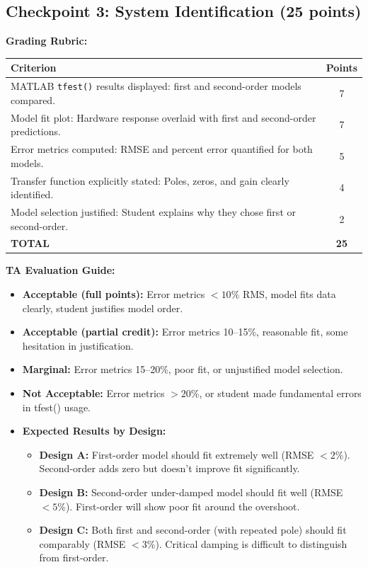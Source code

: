 \documentclass[11pt,letterpaper]{article}
\begin{document}
\subsection{Checkpoint 3: System Identification (25 points)}

\textbf{Grading Rubric:}

\begin{center}
\begin{tabularx}{0.95\textwidth}{|X|c|}
\hline
\textbf{Criterion} & \textbf{Points} \\
\hline
MATLAB \texttt{tfest()} results displayed: first and second-order models compared. & 7 \\
\hline
Model fit plot: Hardware response overlaid with first and second-order predictions. & 7 \\
\hline
Error metrics computed: RMSE and percent error quantified for both models. & 5 \\
\hline
Transfer function explicitly stated: Poles, zeros, and gain clearly identified. & 4 \\
\hline
Model selection justified: Student explains why they chose first or second-order. & 2 \\
\hline
\textbf{TOTAL} & \textbf{25} \\
\hline
\end{tabularx}
\end{center}

\noindent
\textbf{TA Evaluation Guide:}

\begin{itemize}
    \item \textbf{Acceptable (full points):} Error metrics $< 10\%$ RMS, model fits data clearly, student justifies model order.
    \item \textbf{Acceptable (partial credit):} Error metrics 10--15\%, reasonable fit, some hesitation in justification.
    \item \textbf{Marginal:} Error metrics 15--20\%, poor fit, or unjustified model selection.
    \item \textbf{Not Acceptable:} Error metrics $> 20\%$, or student made fundamental errors in tfest() usage.

    \item \textbf{Expected Results by Design:}
        \begin{itemize}
            \item \textbf{Design A:} First-order model should fit extremely well (RMSE $< 2\%$). Second-order adds zero but doesn't improve fit significantly.
            \item \textbf{Design B:} Second-order under-damped model should fit well (RMSE $< 5\%$). First-order will show poor fit around the overshoot.
            \item \textbf{Design C:} Both first and second-order (with repeated pole) should fit comparably (RMSE $< 3\%$). Critical damping is difficult to distinguish from first-order.
        \end{itemize}
\end{itemize}
\end{document}
